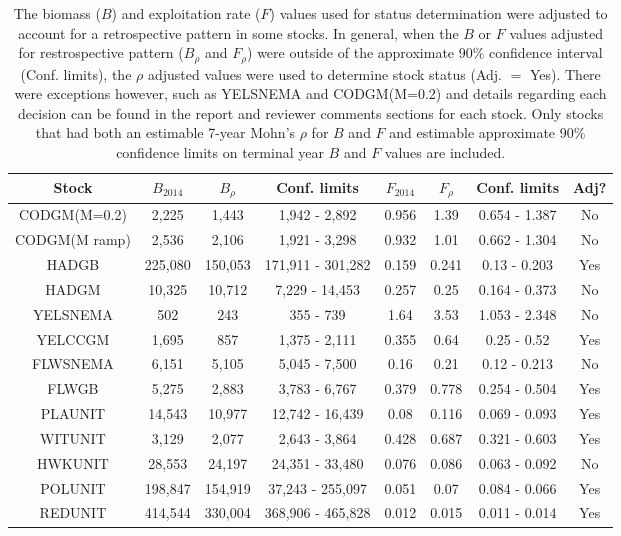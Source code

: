 \begin{table*}[ht]
\centering
\caption{The biomass ($B$) and exploitation rate ($F$) values used for status determination were  adjusted to account for a retrospective pattern in some stocks.   In general, when the $B$ or $F$ values adjusted for restrospective pattern ($B_{\rho}$ and $F_{\rho}$)  were outside of the approximate $90\%$ confidence interval (Conf. limits), the  $\rho$ adjusted values were used to determine stock status (Adj. $=$ Yes).  There were exceptions however, such as YELSNEMA and CODGM(M=0.2) and details regarding each decision can be found in the  report and reviewer comments sections for each stock.  Only stocks that had both an estimable 7-year Mohn's $\rho$ for $B$ and $F$ and estimable approximate  90\% confidence limits on  terminal year $B$ and $F$ values are included. } 
\label{RhoDecision_tab}
\begin{tabular}{c@{\hspace{.2cm}}c@{\hspace{.2cm}}c@{\hspace{.2cm}}c@{\hspace{.2cm}}c@{\hspace{.2cm}}c@{\hspace{.2cm}}c@{\hspace{.2cm}}c@{\hspace{.2cm}}}
  \hline
Stock & $B_{2014}$ & $B_{\rho}$ & Conf. limits & $F_{2014}$ & $F_{\rho}$ & Conf. limits & Adj? \\ 
  \hline
CODGM(M=0.2) & 2,225 & 1,443 & 1,942 - 2,892 & 0.956 &  1.39 & 0.654 - 1.387 & No \\ 
  CODGM(M ramp) & 2,536 & 2,106 & 1,921 - 3,298 & 0.932 &  1.01 & 0.662 - 1.304 & No \\ 
  HADGB & 225,080 & 150,053 & 171,911 - 301,282 & 0.159 & 0.241 & 0.13 - 0.203 & Yes \\ 
  HADGM & 10,325 & 10,712 & 7,229 - 14,453 & 0.257 &  0.25 & 0.164 - 0.373 & No \\ 
  YELSNEMA & 502 & 243 & 355 - 739 &  1.64 &  3.53 & 1.053 - 2.348 & No \\ 
  YELCCGM & 1,695 & 857 & 1,375 - 2,111 & 0.355 &  0.64 & 0.25 - 0.52 & Yes \\ 
  FLWSNEMA & 6,151 & 5,105 & 5,045 - 7,500 &  0.16 &  0.21 & 0.12 - 0.213 & No \\ 
  FLWGB & 5,275 & 2,883 & 3,783 - 6,767 & 0.379 & 0.778 & 0.254 - 0.504 & Yes \\ 
  PLAUNIT & 14,543 & 10,977 & 12,742 - 16,439 &  0.08 & 0.116 & 0.069 - 0.093 & Yes \\ 
  WITUNIT & 3,129 & 2,077 & 2,643 - 3,864 & 0.428 & 0.687 & 0.321 - 0.603 & Yes \\ 
  HWKUNIT & 28,553 & 24,197 & 24,351 - 33,480 & 0.076 & 0.086 & 0.063 - 0.092 & No \\ 
  POLUNIT & 198,847 & 154,919 & 37,243 - 255,097 & 0.051 &  0.07 & 0.084 - 0.066 & Yes \\ 
  REDUNIT & 414,544 & 330,004 & 368,906 - 465,828 & 0.012 & 0.015 & 0.011 - 0.014 & Yes \\ 
   \hline
\end{tabular}
\end{table*}
